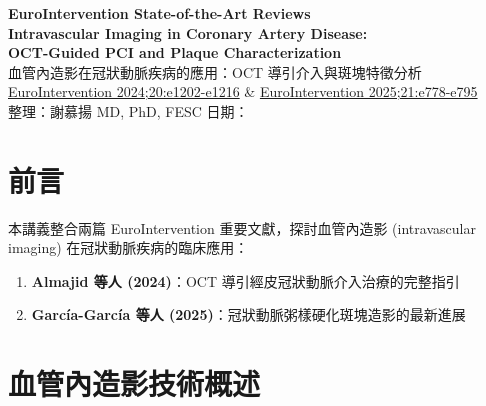 \documentclass[12pt,a4paper]{article}
\begin{document}
\begin{center}
{\LARGE\bfseries\textcolor{emergency_red}{EuroIntervention State-of-the-Art Reviews}}\\[0.5cm]
{\Large\textbf{Intravascular Imaging in Coronary Artery Disease:}}\\[0.2cm]
{\Large\textbf{OCT-Guided PCI and Plaque Characterization}}\\[0.3cm]
{\large 血管內造影在冠狀動脈疾病的應用：OCT 導引介入與斑塊特徵分析}\\[0.5cm]
{\normalsize \href{https://doi.org/10.4244/EIJ-D-23-00912}{EuroIntervention 2024;20:e1202-e1216} \& \href{https://doi.org/10.4244/EIJ-D-24-00387}{EuroIntervention 2025;21:e778-e795}}\\[0.3cm]
{\normalsize 整理：謝慕揚 MD, PhD, FESC \quad 日期：\mydate}
\end{center}

\vspace{0.5cm}

\tableofcontents

\newpage

\section{前言}

本講義整合兩篇 EuroIntervention 重要文獻，探討血管內造影 (intravascular imaging) 在冠狀動脈疾病的臨床應用：

\begin{enumerate}
    \item \textbf{Almajid 等人 (2024)}：OCT 導引經皮冠狀動脈介入治療的完整指引
    \item \textbf{García-García 等人 (2025)}：冠狀動脈粥樣硬化斑塊造影的最新進展
\end{enumerate}


\section{血管內造影技術概述}
\end{document}
